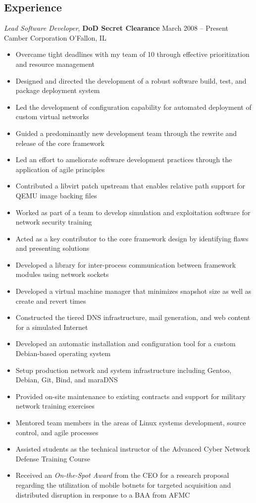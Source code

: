 \documentclass[margin,line]{resume}
\begin{document}
\begin{resume}
\section{Experience}

{\sl Lead Software Developer}, \textbf{\small DoD Secret Clearance}   \hfill  March 2008 -- Present\\
Camber Corporation                                                    \hfill  O'Fallon, IL
\begin{itemize} \itemsep -1pt %
\small\item Overcame tight deadlines with my team of 10 through effective prioritization and resource management
\small\item Designed and directed the development of a robust software build, test, and package deployment system
\small\item Led the development of configuration capability for automated deployment of custom virtual networks
\small\item Guided a predominantly new development team through the rewrite and release of the core framework
\small\item Led an effort to ameliorate software development practices through the application of agile principles
\small\item Contributed a libvirt patch upstream that enables relative path support for QEMU image backing files
\small\item Worked as part of a team to develop simulation and exploitation software for network security training
\small\item Acted as a key contributor to the core framework design by identifying flaws and presenting solutions
\small\item Developed a library for inter-process communication between framework modules using network sockets
\small\item Developed a virtual machine manager that minimizes snapshot size as well as create and revert times
\small\item Constructed the tiered DNS infrastructure, mail generation, and web content for a simulated Internet
\small\item Developed an automatic installation and configuration tool for a custom Debian-based operating system
\small\item Setup production network and system infrastructure including Gentoo, Debian, Git, Bind, and maraDNS
\small\item Provided on-site maintenance to existing contracts and support for military network training exercises
\small\item Mentored team members in the areas of Linux systems development, source control, and agile processes
\small\item Assisted students as the technical instructor of the Advanced Cyber Network Defense Training Course
\small\item Received an {\sl On-the-Spot Award} from the CEO for a research proposal regarding the utilization of
            mobile botnets for targeted acquisition and distributed disruption in response to a BAA from AFMC


\end{itemize}
\end{resume}
\end{document}
